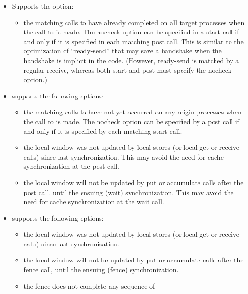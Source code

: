 \begin{itemize}
\item {} Supports the option:
  \begin{itemize}
    \item {} the matching calls to  have already
    completed on all target processes when the call to  is
    made. The nocheck option can be specified in a start call if and
    only if it is specified in each matching post call. This is similar
    to the optimization of ``ready-send'' that may save a handshake when
    the handshake is implicit in the code. (However, ready-send is
    matched by a regular receive, whereas both start and post must
    specify the nocheck option.)
  \end{itemize}
\item {} supports the following options:
  \begin{itemize}
  \item {} the matching calls to  have not
    yet occurred on any origin processes when the call to 
    is made. The nocheck option can be specified by a post call if and
    only if it is specified by each matching start call.
  \item {} the local window was not updated by local
    stores (or local get or receive calls) since last
    synchronization. This may avoid the need for cache synchronization
    at the post call.
  \item {} the local window will not be updated by put or
    accumulate calls after the post call, until the ensuing (wait)
    synchronization. This may avoid the need for cache synchronization
    at the wait call.
  \end{itemize}
\item {} supports the following options:
  \begin{itemize}
  \item {} the local window was not updated by local
    stores (or local get or receive calls) since last synchronization.
  \item {} the local window will not be updated by put or
    accumulate calls after the fence call, until the ensuing (fence)
    synchronization.
  \item {} the fence does not complete any sequence of

\end{itemize}
\end{itemize}
